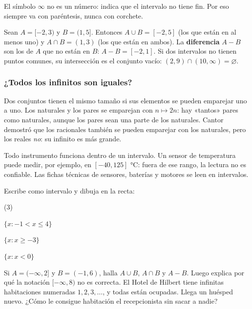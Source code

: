 \documentclass[11pt]{article}
\begin{document}
El símbolo $\infty$ no es un número: indica que el intervalo no tiene fin. Por eso
siempre va con paréntesis, nunca con corchete.

\begin{ejemplo}
Sean $A = [-2, 3)$ y $B = (1, 5]$. Entonces
$A \cup B = [-2, 5]$ (los que están en al menos uno) y
$A \cap B = (1, 3)$ (los que están en ambos). La \textbf{diferencia} $A - B$ son los
de $A$ que no están en $B$: $A - B = [-2, 1]$. Si dos intervalos no tienen puntos
comunes, su intersección es el conjunto vacío: $(2, 9) \cap (10, \infty) = \varnothing$.

\begin{center}
\end{center}
\end{ejemplo}

\subsubsection*{¿Todos los infinitos son iguales?}

Dos conjuntos tienen el mismo tamaño si sus elementos se pueden emparejar uno a
uno. Los naturales y los pares se emparejan con $n \mapsto 2n$: hay «tantos» pares
como naturales, aunque los pares sean una parte de los naturales. Cantor
demostró que los racionales también se pueden emparejar con los naturales, pero
los reales \emph{no}: su infinito es más grande.

\begin{aplicacion}
Todo instrumento funciona dentro de un intervalo. Un sensor de temperatura puede
medir, por ejemplo, en $[-40, 125]$ °C: fuera de ese rango, la lectura no es
confiable. Las fichas técnicas de sensores, baterías y motores se leen en
intervalos.
\end{aplicacion}

\begin{preguntas}
\pregunta Escribe como intervalo y dibuja en la recta:
\begin{opciones*}(3)
  \item $\{x : -1 < x \le 4\}$
  \item $\{x : x \ge -3\}$
  \item $\{x : x < 0\}$
\end{opciones*}
\espacio{3cm}
\pregunta Si $A = (-\infty, 2]$ y $B = (-1, 6)$, halla $A \cup B$, $A \cap B$ y
$A - B$. Luego explica por qué la notación $[-\infty, 8)$ no es correcta.
\espacio{2.5cm}
\pregunta El Hotel de Hilbert tiene infinitas habitaciones numeradas $1, 2, 3,
\ldots$, y todas están ocupadas. Llega un huésped nuevo. ¿Cómo le consigue
habitación el recepcionista sin sacar a nadie?
\end{preguntas}
\end{document}
